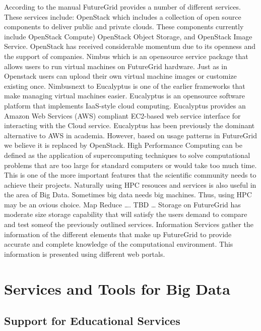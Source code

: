 \documentclass{article}
\begin{document}
According to the manual FutureGrid provides a number of different services. These services include:
OpenStack which includes a collection of open source components to deliver public and private clouds. These components currently include OpenStack Compute) OpenStack Object Storage, and OpenStack Image Service. OpenStack has received considerable momentum due to its openness and the support of companies. 
Nimbus which is an opensource service package that allows users to run virtual machines on FutureGrid hardware. Just as in Openstack users can upload their own virtual machine images or customize existing once. Nimbusnext to Eucalyptus is one of the earlier frameworks that make managing virtual machines easier.
Eucalyptus is an opensource software platform that implements IaaS-style cloud computing. Eucalyptus provides an Amazon Web Services (AWS) compliant EC2-based web service interface for interacting with the Cloud service.  Eucalyptus has been previously the dominant alternative to AWS  in academia. However, based on usage patterns in FutureGrid we believe it is replaced by OpenStack.
High Performance Computing can be defined as the application of supercomputing techniques to solve computational problems that are too large for standard computers or would take too much time. This is one of the more important features that the scientific community needs to achieve their projects. Naturally using HPC resouces and services is also useful in the area of Big Data. Sometimes big data needs big machines. Thus, using HPC may be an ovious choice.
Map Reduce …. TBD …
Storage on FutureGrid has moderate size storage capability that will satisfy the users demand to compare and test someof the previously outlined services.
Information Services gather the information of the different elements that make up FutureGrid to provide accurate and complete knowledge of the computational environment. This information is presented using different web portals.









\section{Services and Tools for Big Data}

\subsection{Support for Educational Services}
\end{document}
